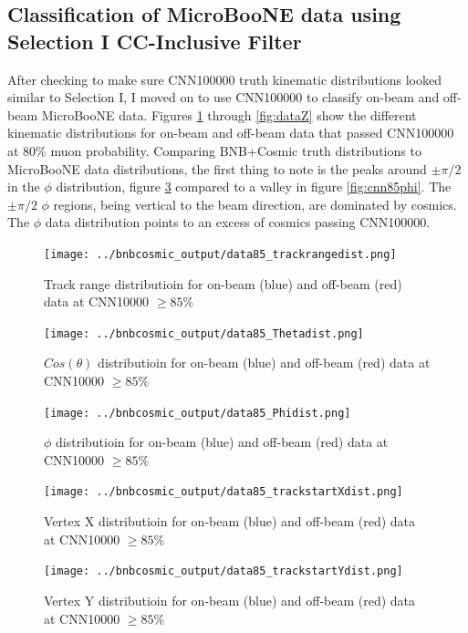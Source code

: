 \subsection{Classification of MicroBooNE data using Selection I CC-Inclusive Filter}
After checking to make sure CNN100000 truth kinematic distributions looked similar to Selection I, I moved on to use CNN100000 to classify on-beam and off-beam MicroBooNE data. Figures \ref{fig:datatrackrange} through \ref{fig:dataZ} show the different kinematic distributions for on-beam and off-beam data that passed CNN100000 at 80\% muon probability. Comparing BNB+Cosmic truth distributions to MicroBooNE data distributions, the first thing to note is the peaks around $\pm\pi/2$ in the $\phi$ distribution, figure \ref{fig:dataphi} compared to a valley in figure \ref{fig:cnn85phi}. The $\pm\pi/2$ $\phi$ regions, being vertical to the beam direction, are dominated by cosmics. The $\phi$ data distribution points to an excess of cosmics passing CNN100000. 
\begin{figure}[htp!]
\centering
\texttt{[image: ../bnbcosmic\_output/data85\_trackrangedist.png]}
\caption{Track range distributioin for on-beam (blue) and off-beam (red) data at CNN10000 $\geq 85\%$} 
\label{fig:datatrackrange}
\end{figure}

\begin{figure}[htp!]
\centering
\texttt{[image: ../bnbcosmic\_output/data85\_Thetadist.png]}
\caption{$Cos(\theta)$ distributioin for on-beam (blue) and off-beam (red) data at CNN10000 $\geq 85\%$} 
\label{fig:datatheta}
\end{figure}

\begin{figure}[htp!]
\centering
\texttt{[image: ../bnbcosmic\_output/data85\_Phidist.png]}
\caption{$\phi$ distributioin for on-beam (blue) and off-beam (red) data at CNN10000 $\geq 85\%$} 
\label{fig:dataphi}
\end{figure}

\begin{figure}[htp!]
\centering
\texttt{[image: ../bnbcosmic\_output/data85\_trackstartXdist.png]}
\caption{Vertex X distributioin for on-beam (blue) and off-beam (red) data at CNN10000 $\geq 85\%$} 
\label{fig:dataX}
\end{figure}

\begin{figure}[htp!]
\centering
\texttt{[image: ../bnbcosmic\_output/data85\_trackstartYdist.png]}
\caption{Vertex Y distributioin for on-beam (blue) and off-beam (red) data at CNN10000 $\geq 85\%$} 
\label{fig:dataY}
\end{figure}

